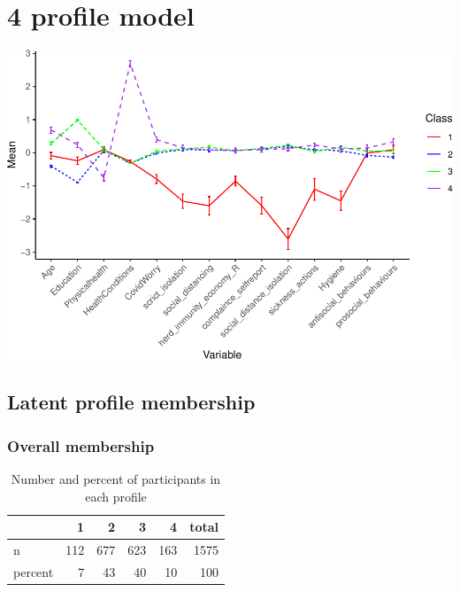 \documentclass[]{article}
\begin{document}
\newpage

\hypertarget{profile-model-2}{%
\section{4 profile model}\label{profile-model-2}}

\includegraphics{lpa_analyses_files/figure-latex/unnamed-chunk-21-1.pdf}

\hypertarget{latent-profile-membership-2}{%
\subsection{Latent profile
membership}\label{latent-profile-membership-2}}

\hypertarget{overall-membership-2}{%
\subsubsection{Overall membership}\label{overall-membership-2}}

\begin{table}[H]

\caption{\label{tab:unnamed-chunk-22}Number and percent of participants in each profile}
\centering
\fontsize{6}{8}\selectfont
\begin{tabular}[t]{lrrrrr}
\toprule
  & 1 & 2 & 3 & 4 & total\\
\midrule
n & 112 & 677 & 623 & 163 & 1575\\
percent & 7 & 43 & 40 & 10 & 100\\
\bottomrule
\end{tabular}
\end{table}
\end{document}
